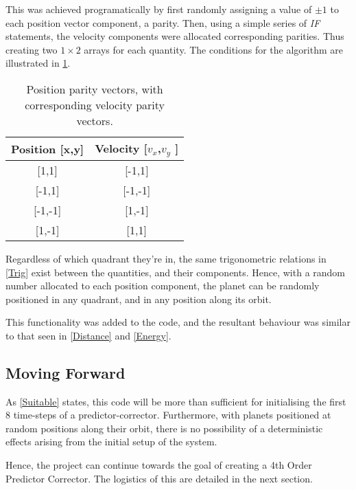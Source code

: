 \documentclass[a4paper,10pt]{article}
\begin{document}
This was achieved programatically by first randomly assigning a value of $\pm 1$ to each position vector component, a parity. Then, using a simple series of \textit{IF} statements, the velocity components were allocated corresponding parities. Thus creating two $1\times 2$ arrays for each quantity. The conditions for the algorithm are illustrated in \cref{Algorithm}.

\begin{table}[h!]
\centering
\def\arraystretch{1.7}
\begin{tabular}{c|c}
\multicolumn{1}{l|}{Position {[}x,y{]}} & \multicolumn{1}{l}{Velocity {[}$v_x$,$v_y$ {]}} \\ \hline
{[}1,1{]}                               & {[}-1,1{]}                                      \\ \hline
{[}-1,1{]}                              & {[}-1,-1{]}                                     \\ \hline
{[}-1,-1{]}                             & {[}1,-1{]}                                      \\ \hline
{[}1,-1{]}                              & {[}1,1{]}                                      
\end{tabular}
\caption{\label{Algorithm} Position parity vectors, with corresponding velocity parity vectors.}
\end{table}

Regardless of which quadrant they're in, the same trigonometric relations in \cref{Trig} exist between the quantities, and their components. Hence, with a random number allocated to each position component, the planet can be randomly positioned in any quadrant, and in any position along its orbit.

This functionality was added to the code, and the resultant behaviour was similar to that seen in \cref{Distance} and \cref{Energy}.

\subsection{Moving Forward}

As \cref{Suitable} states, this code will be more than sufficient for initialising the first 8 time-steps of a predictor-corrector. Furthermore, with planets positioned at random positions along their orbit, there is no possibility of a deterministic effects arising from the initial setup of the system. 

Hence, the project can continue towards the goal of creating a 4th Order Predictor Corrector. The logistics of this are detailed in the next section.
\pagebreak[4]
\end{document}
